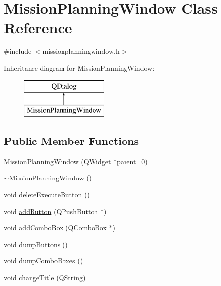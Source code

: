\hypertarget{class_mission_planning_window}{}\section{Mission\+Planning\+Window Class Reference}
\label{class_mission_planning_window}


{\ttfamily \#include $<$missionplanningwindow.\+h$>$}

Inheritance diagram for Mission\+Planning\+Window\+:\begin{figure}[H]
\begin{center}
\leavevmode
\includegraphics[height=2.000000cm]{class_mission_planning_window}
\end{center}
\end{figure}
\subsection*{Public Member Functions}
\begin{DoxyCompactItemize}
\item 
\hyperlink{class_mission_planning_window_a4ce75f53873c10f1053e7aff288f42ce}{Mission\+Planning\+Window} (Q\+Widget $\ast$parent=0)
\item 
\hyperlink{class_mission_planning_window_a2dd1e975fa9ab1f843dc4440436d066b}{$\sim$\+Mission\+Planning\+Window} ()
\item 
void \hyperlink{class_mission_planning_window_a995569fb123c9df67ba52db675543ab0}{delete\+Execute\+Button} ()
\item 
void \hyperlink{class_mission_planning_window_af3cb4549864921d72a3919412c1a9565}{add\+Button} (Q\+Push\+Button $\ast$)
\item 
void \hyperlink{class_mission_planning_window_a69829c310643543db1a5c5b3c6c72359}{add\+Combo\+Box} (Q\+Combo\+Box $\ast$)
\item 
void \hyperlink{class_mission_planning_window_a015cb8e3949a82535ec53a30520622e9}{dump\+Buttons} ()
\item 
void \hyperlink{class_mission_planning_window_a87d851bd04f183dabdd8b95d0bcd5e52}{dump\+Combo\+Boxes} ()
\item 
void \hyperlink{class_mission_planning_window_a685f4ba0b024f1eff55329bd21b9b397}{change\+Title} (Q\+String)
\end{DoxyCompactItemize}
